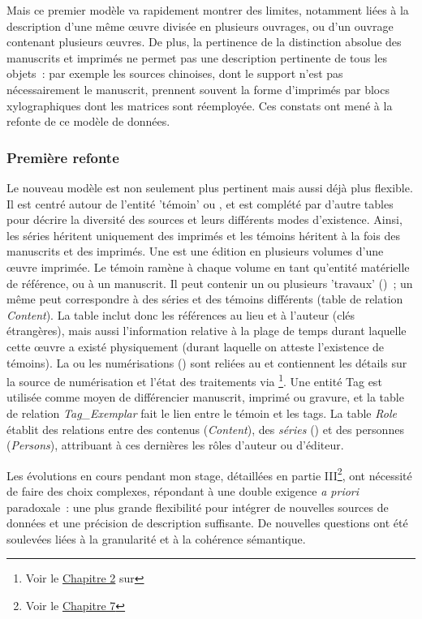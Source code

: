 Mais ce premier modèle va rapidement montrer des limites, notamment
liées à la description d'une même œuvre divisée en plusieurs ouvrages,
ou d'un ouvrage contenant plusieurs œuvres. De plus, la pertinence de la
distinction absolue des manuscrits et imprimés ne permet pas une
description pertinente de tous les objets~: par exemple les sources
chinoises, dont le support n'est pas nécessairement le manuscrit,
prennent souvent la forme d'imprimés par blocs xylographiques dont les
matrices sont réemployée. Ces constats ont mené à la refonte de ce
modèle de données. 

\hypertarget{premiere-refonte}{%
\subsubsection{Première refonte}\label{premiere-refonte}}

Le nouveau modèle est non seulement plus pertinent mais aussi déjà plus
flexible. Il est centré autour de l'entité 'témoin' ou \wit, et
est complété par d'autre tables pour décrire la diversité des sources et
leurs différents modes d'existence. Ainsi, les séries héritent
uniquement des imprimés et les témoins héritent à la fois des
manuscrits et des imprimés. Une \ser est une édition en
plusieurs volumes d'une œuvre imprimée. Le témoin ramène à chaque volume
en tant qu'entité matérielle de référence, ou à un manuscrit. Il peut
contenir un ou plusieurs 'travaux' (\wo)~; un même \wo peut
correspondre à des séries et des témoins différents (table de relation
\textit{Content}). La table \wo inclut donc les références au lieu et à l'auteur
(clés étrangères), mais aussi l'information relative à la plage de temps
durant laquelle cette œuvre a existé physiquement (durant laquelle on
atteste l'existence de témoins). La ou les numérisations
(\digits) sont reliées au \wit et contiennent les détails sur la
source de numérisation et l'état des traitements via \iiif\footnote{Voir le \hyperlink{iiif}{Chapitre 2} sur \iiif}. Une entité Tag est utilisée comme moyen de
différencier manuscrit, imprimé ou gravure, et la table de relation
\textit{Tag\_Exemplar} fait le lien entre le témoin et les tags. La table
\textit{Role} établit des relations entre des contenus (\textit{Content}), des
\emph{séries} (\sers) et des personnes (\textit{Persons}), attribuant à
ces dernières les rôles d'auteur ou d'éditeur.

Les évolutions en cours pendant mon stage, détaillées en partie
III\footnote{Voir le \hyperlink{chapitre-7-processus-et-fonctionnalites}{Chapitre 7}}, ont nécessité de faire des choix
complexes, répondant à une double exigence \emph{a priori} paradoxale~:
une plus grande flexibilité pour intégrer de nouvelles sources de
données et une précision de description suffisante. De nouvelles
questions ont été soulevées liées à la granularité et à la cohérence
sémantique.

